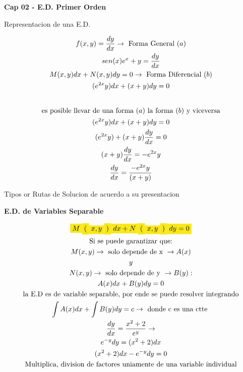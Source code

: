 \documentclass{article}
\begin{document}
\textbf{Cap 02 - E.D. Primer Orden}

Representacion de una E.D.


\begin{gather*}
f(x,y) = \frac{dy}{dx}   \rightarrow \text{ Forma General }(a) \\
sen(x)e^{x}+y = \frac{dy}{dx} \\
M(x,y)dx +N(x,y)dy = 0  \rightarrow \text{ Forma Diferencial }(b) \\
(e^{2x}y)dx+(x+y)dy = 0  \\
\vspace{0.5em} \\
\text{es posible llevar de una forma }(a)\text{  la forma }(b)\text{ y viceversa} \\
(e^{2x}y)dx+(x+y)dy = 0  \\
(e^{2x}y)+(x+y)\frac{dy}{dx} = 0  \\
(x+y)\frac{dy}{dx} = -e^{2x}y \\
\frac{dy}{dx} = \frac{-e^{2x}y}{(x+y)}
\end{gather*}


Tipos or Rutas de Solucion de acuerdo a su presentacion

\textbf{E.D. de Variables Separable}


\begin{gather*}
\text{\colorbox[RGB]{248,231,28}{$M$}}\text{\colorbox[RGB]{248,231,28}{$($}}\text{\colorbox[RGB]{248,231,28}{$x,y$}}\text{\colorbox[RGB]{248,231,28}{$)$}}\text{\colorbox[RGB]{248,231,28}{$dx +N$}}\text{\colorbox[RGB]{248,231,28}{$($}}\text{\colorbox[RGB]{248,231,28}{$x,y$}}\text{\colorbox[RGB]{248,231,28}{$)$}}\text{\colorbox[RGB]{248,231,28}{$dy = 0 $}} \\
\text{Si se puede garantizar que:} \\
M(x,y)  \rightarrow \text{ solo depende de x } \rightarrow  A(x) \\
y \\
N(x,y) \rightarrow \text{ solo depende de y } \rightarrow  B(y): \\
A(x)dx +B(y)dy = 0  \\
\text{la E.D es de variable separable, por ende se puede resolver integrando} \\
\int A(x)dx +\int B(y)dy = c  \rightarrow \text{ donde c  es una ctte } \\
\frac{dy}{dx} = \frac{x^{2}+2}{e^{y}}  \rightarrow   \\
e^{-y}dy = (x^{2}+2)dx \\
(x^{2}+2)dx-e^{-y}dy =0 \\
\text{Multiplica, division de factores uniamente de una variable individual}
\end{gather*}
\end{document}
